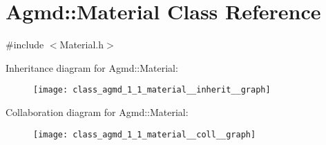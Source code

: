 \hypertarget{class_agmd_1_1_material}{\section{Agmd\+:\+:Material Class Reference}
\label{class_agmd_1_1_material}
}


{\ttfamily \#include $<$Material.\+h$>$}



Inheritance diagram for Agmd\+:\+:Material\+:\nopagebreak
\begin{figure}[H]
\begin{center}
\leavevmode
\texttt{[image: class\_agmd\_1\_1\_material\_\_inherit\_\_graph]}
\end{center}
\end{figure}


Collaboration diagram for Agmd\+:\+:Material\+:\nopagebreak
\begin{figure}[H]
\begin{center}
\leavevmode
\texttt{[image: class\_agmd\_1\_1\_material\_\_coll\_\_graph]}
\end{center}
\end{figure}
